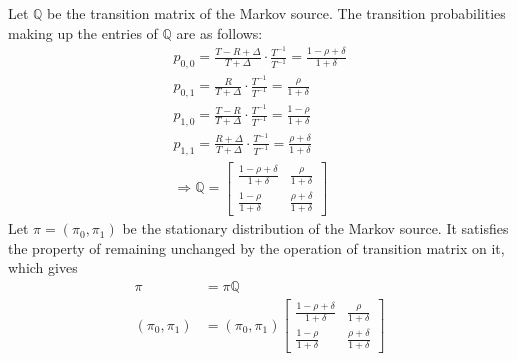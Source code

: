 \documentclass[
  coursecode={MTHE 474},
  assignmentname={Homework \homeworknumber},
  studentnumber=20053722,
  name={Bryan Hoang},
  draft,
]{
  ltxanswer%
}
\begin{document}
  \begin{questions}
    \setcounter{question}{\questionnumber}
    \addtocounter{question}{-1}
    \question[15]\
    \begin{parts}
      \part{}
      \begin{solution}
        Let \(\mathbb{Q}\) be the transition matrix of the Markov source. The transition probabilities making up the entries of \(\mathbb{Q}\) are as follows:
        \begin{gather*}
          p_{0,0} = \frac{T-R+\Delta}{T+\Delta} \cdot \frac{T^{-1}}{T^{-1}} = \frac{1-\rho+\delta}{1+\delta} \\
          p_{0,1} = \frac{R}{T+\Delta} \cdot \frac{T^{-1}}{T^{-1}} = \frac{\rho}{1+\delta}                   \\
          p_{1,0} = \frac{T-R}{T+\Delta} \cdot \frac{T^{-1}}{T^{-1}} = \frac{1-\rho}{1+\delta}               \\
          p_{1,1} = \frac{R+\Delta}{T+\Delta} \cdot \frac{T^{-1}}{T^{-1}} = \frac{\rho+\delta}{1+\delta} \\
          \Rightarrow \boxed{
            \mathbb{Q} = \begin{bmatrix}
              \frac{1-\rho+\delta}{1+\delta} & \frac{\rho}{1+\delta}        \\
              \frac{1-\rho}{1+\delta}        & \frac{\rho+\delta}{1+\delta}
            \end{bmatrix}
          }
        \end{gather*}
        Let \(\pi = (\pi_{0},\pi_{1})\) be the stationary distribution of the Markov source. It satisfies the property of remaining unchanged by the operation of transition matrix on it, which gives
        \begin{align*}
          \pi               &= \pi\mathbb{Q}                                                                   \\
          (\pi_{0},\pi_{1}) &= (\pi_{0},\pi_{1}) \begin{bmatrix}
                                                   \frac{1-\rho+\delta}{1+\delta} & \frac{\rho}{1+\delta}        \\
                                                   \frac{1-\rho}{1+\delta}        & \frac{\rho+\delta}{1+\delta}
                                                 \end{bmatrix}

\end{align*}
\end{solution}
\end{parts}
\end{questions}
\end{document}
